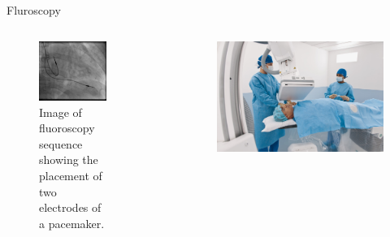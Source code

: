 \begin{frame}{Fluroscopy}
    \begin{columns}[t, onlytextwidth]
        \begin{column}{0.4\textwidth}
            \begin{figure}[htpb]
                \centering
            \includegraphics[height=0.6\textheight]{images/Fluoroscopy_pacemaker_leads_right_atrium_ventricle}%
            \caption{Image of fluoroscopy sequence showing the placement of two electrodes of a pacemaker.}%
            \end{figure}
        \end{column}$\quad$\begin{column}{0.6\textwidth}
        \begin{figure}
            \centering
            \includegraphics[height=0.6\textheight]{Siemens_Images/SH_AX_36710_13}%

\end{figure}
\end{column}
\end{columns}
\end{frame}
